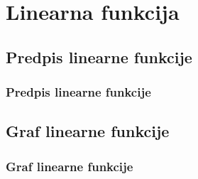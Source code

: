 \section{Linearna funkcija}

\begin{frame}
    \sectionpage
\end{frame}

\begin{frame}
\end{frame}
        

    \subsection{Predpis linearne funkcije}

        \begin{frame}
            \frametitle{Predpis linearne funkcije}
        \end{frame}


    \subsection{Graf linearne funkcije}

        \begin{frame}
            \frametitle{Graf linearne funkcije}
        \end{frame}

        